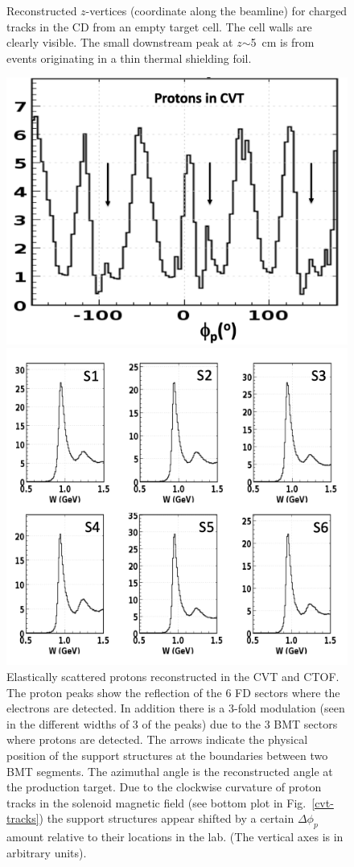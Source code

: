 \documentclass[final,3p,twocolumn]{elsarticle}
\begin{document}
\begin{figure}[t!]
\caption{Reconstructed $z$-vertices (coordinate along the beamline) for charged tracks in the CD from an empty target
  cell. The cell walls are clearly visible. The small downstream peak at $z$$\sim$5~cm is from events originating in a thin
  thermal shielding foil.}
\label{cvt-vertex}
\end{figure}
\begin{figure}[t!]
\centerline{\includegraphics[width=0.8\columnwidth]{CVT-elastic-protons.png}}
\caption{Elastically scattered protons reconstructed in the CVT and CTOF. The proton peaks show the reflection of
  the 6 FD sectors where the electrons are detected. In addition there is a 3-fold modulation (seen in the different
  widths of 3 of the peaks) due to the 3 BMT sectors where protons are detected. The arrows indicate the physical 
  position of the support structures at the boundaries between two BMT segments. The azimuthal angle is the
  reconstructed angle at the production target. Due to the clockwise curvature of proton tracks in the solenoid magnetic
  field (see bottom plot in Fig.~\ref{cvt-tracks}) the support structures appear shifted by a certain $\Delta{\phi_p}$
  amount relative to their locations in the lab. (The vertical axes is in arbitrary units).}
\label{CVT-elastic-protons}
\centerline{\includegraphics[width=0.9\columnwidth]{elastic-electrons.png}}

\end{figure}
\end{document}
